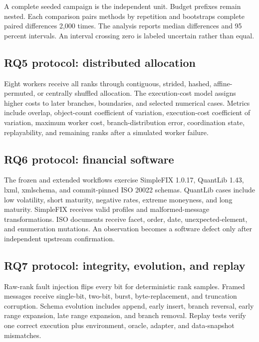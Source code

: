A complete seeded campaign is the independent unit. Budget prefixes remain nested. Each comparison pairs methods by repetition and bootstraps complete paired differences 2,000 times. The analysis reports median differences and 95 percent intervals. An interval crossing zero is labeled uncertain rather than equal.

\subsection{RQ5 protocol: distributed allocation}
Eight workers receive all ranks through contiguous, strided, hashed, affine-permuted, or centrally shuffled allocation. The execution-cost model assigns higher costs to later branches, boundaries, and selected numerical cases. Metrics include overlap, object-count coefficient of variation, execution-cost coefficient of variation, maximum worker cost, branch-distribution error, coordination state, replayability, and remaining ranks after a simulated worker failure.

\subsection{RQ6 protocol: financial software}
The frozen and extended workflows exercise SimpleFIX 1.0.17, QuantLib 1.43, lxml, xmlschema, and commit-pinned ISO 20022 schemas. QuantLib cases include low volatility, short maturity, negative rates, extreme moneyness, and long maturity. SimpleFIX receives valid profiles and malformed-message transformations. ISO documents receive facet, order, date, unexpected-element, and enumeration mutations. An observation becomes a software defect only after independent upstream confirmation.

\subsection{RQ7 protocol: integrity, evolution, and replay}
Raw-rank fault injection flips every bit for deterministic rank samples. Framed messages receive single-bit, two-bit, burst, byte-replacement, and truncation corruption. Schema evolution includes append, early insert, branch reversal, early range expansion, late range expansion, and branch removal. Replay tests verify one correct execution plus environment, oracle, adapter, and data-snapshot mismatches.
